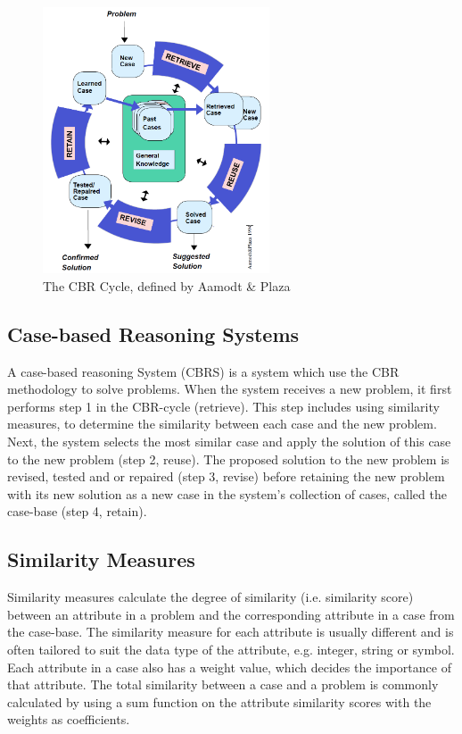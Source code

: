 \begin{figure}[h]
    \centering
    \includegraphics[width=0.6\textwidth]{fig/cbr-cycle.png}
    \caption[The CBR Cycle, defined by Aamodt \& Plaza]{The CBR Cycle, defined by Aamodt \& Plaza \cite{aamodt1994case}}
    \label{fig:cbr_cycle}
\end{figure}

\subsection{Case-based Reasoning Systems}

A case-based reasoning System (CBRS) is a system which use the CBR methodology to solve problems. When the system receives a new problem, it first performs step 1 in the CBR-cycle (retrieve). This step includes using similarity measures, to determine the similarity between each case and the new problem. Next, the system selects the most similar case and apply the solution of this case to the new problem (step 2, reuse). The proposed solution to the new problem is revised, tested and or repaired (step 3, revise) before retaining the new problem with its new solution as a new case in the system's collection of cases, called the case-base (step 4, retain).

\subsection{Similarity Measures}

Similarity measures calculate the degree of similarity (i.e. similarity score) between an attribute in a problem and the corresponding attribute in a case from the case-base. The similarity measure for each attribute is usually different and is often tailored to suit the data type of the attribute, e.g. integer, string or symbol. Each attribute in a case also has a weight value, which decides the importance of that attribute. The total similarity between a case and a problem is commonly calculated by using a sum function on the attribute similarity scores with the weights as coefficients.


